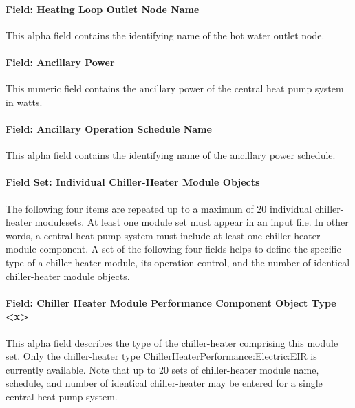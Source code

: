 \paragraph{Field: Heating Loop Outlet Node Name}\label{field-heating-loop-outlet-node-name}

This alpha field contains the identifying name of the hot water outlet node.

\paragraph{Field: Ancillary Power}\label{field-ancillary-power-000}

This numeric field contains the ancillary power of the central heat pump system in watts.

\paragraph{Field: Ancillary Operation Schedule Name}\label{field-ancillary-operation-schedule-name}

This alpha field contains the identifying name of the ancillary power schedule.

\paragraph{Field Set: Individual Chiller-Heater Module Objects}\label{field-set-individual-chiller-heater-module-objects}

The following four items are repeated up to a maximum of 20 individual chiller-heater modulesets. At least one module set must appear in an input file. In other words, a central heat pump system must include at least one chiller-heater module component. A set of the following four fields helps to define the specific type of a chiller-heater module, its operation control, and the number of identical chiller-heater module objects.

\paragraph{Field: Chiller Heater Module Performance Component Object Type \textless{}x\textgreater{}}\label{field-chiller-heater-module-performance-component-object-type-x}

This alpha field describes the type of the chiller-heater comprising this module set. Only the chiller-heater type \hyperref[chillerheaterperformancelectriceir]{ChillerHeaterPerformance:Electric:EIR} is currently available. Note that up to 20 sets of chiller-heater module name, schedule, and number of identical chiller-heater may be entered for a single central heat pump system.

